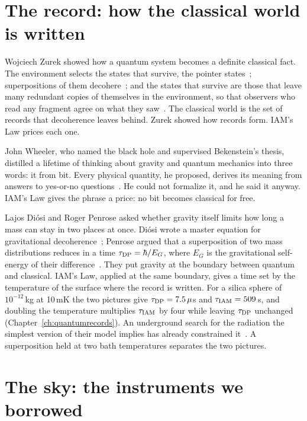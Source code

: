 \section*{The record: how the classical world is written}

Wojciech Zurek showed how a quantum system becomes a definite classical fact. The environment selects the states that survive, the pointer
states~\cite{Zurek1981}; superpositions of them decohere~\cite{JoosZeh1985,Zurek2003}; and the states that survive are those that leave many
redundant copies of themselves in the environment, so that observers who read any fragment agree on what they saw~\cite{Zurek2009}. \derived{}
The classical world is the set of records that decoherence leaves behind. Zurek showed how records form. IAM's Law prices each one.

John Wheeler, who named the black hole and supervised Bekenstein's thesis, distilled a lifetime of thinking about gravity and quantum
mechanics into three words: it from bit. Every physical quantity, he proposed, derives its meaning from answers to yes-or-no
questions~\cite{WheelerItFromBit}. \conjecture{} He could not formalize it, and he said it anyway. IAM's Law gives the phrase a price: no
bit becomes classical for free. \interp

Lajos Di\'osi and Roger Penrose asked whether gravity itself limits how long a mass can stay in two places at once. Di\'osi wrote a master
equation for gravitational decoherence~\cite{Diosi1987,Diosi1989}; Penrose argued that a superposition of two mass distributions reduces in a
time $\tau_{\rm DP}=\hbar/E_G$, where $E_G$ is the gravitational self-energy of their difference~\cite{Penrose1996}. \conjecture{} They put
gravity at the boundary between quantum and classical. IAM's Law, applied at the same boundary, gives a time set by the temperature of the
surface where the record is written. For a silica sphere of $10^{-12}$\,kg at 10\,mK the two pictures give $\tau_{\rm DP}=7.5\,\mu$s and
$\tau_{\rm IAM}=509$\,s, and doubling the temperature multiplies $\tau_{\rm IAM}$ by four while leaving $\tau_{\rm DP}$ unchanged
(Chapter~\ref{ch:quantumrecords}). \calc{} An underground search for the radiation the simplest version of their model implies has already
constrained it~\cite{Donadi2021}. \observed{} A superposition held at two bath temperatures separates the two pictures. \prediction

\section*{The sky: the instruments we borrowed}


